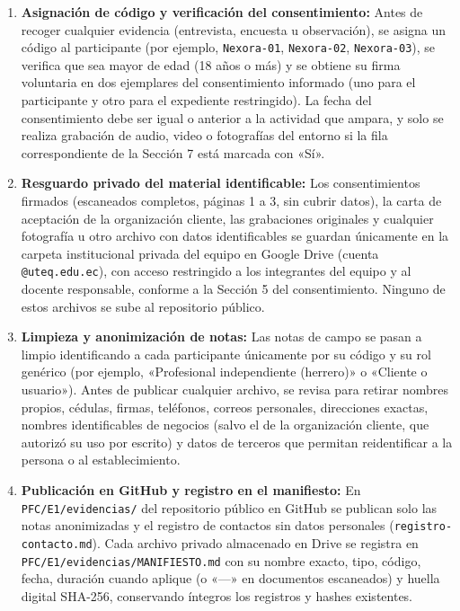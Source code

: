 \documentclass[11pt,a4paper]{article}
\begin{document}
\begin{enumerate}[label=\textbf{\arabic*.}, leftmargin=1.8em, itemsep=3pt, topsep=3pt]
    \item \textbf{Asignaci\'on de c\'odigo y verificaci\'on del consentimiento:} Antes de recoger cualquier evidencia (entrevista, encuesta u observaci\'on), se asigna un c\'odigo al participante (por ejemplo, \texttt{Nexora-01}, \texttt{Nexora-02}, \texttt{Nexora-03}), se verifica que sea mayor de edad (18 a\~nos o m\'as) y se obtiene su firma voluntaria en dos ejemplares del consentimiento informado (uno para el participante y otro para el expediente restringido). La fecha del consentimiento debe ser igual o anterior a la actividad que ampara, y solo se realiza grabaci\'on de audio, video o fotograf\'ias del entorno si la fila correspondiente de la Secci\'on 7 est\'a marcada con «S\'i».
    \item \textbf{Resguardo privado del material identificable:} Los consentimientos firmados (escaneados completos, p\'aginas 1 a 3, sin cubrir datos), la carta de aceptaci\'on de la organizaci\'on cliente, las grabaciones originales y cualquier fotograf\'ia u otro archivo con datos identificables se guardan \'unicamente en la carpeta institucional privada del equipo en Google Drive (cuenta \texttt{@uteq.edu.ec}), con acceso restringido a los integrantes del equipo y al docente responsable, conforme a la Secci\'on 5 del consentimiento. Ninguno de estos archivos se sube al repositorio p\'ublico.
    \item \textbf{Limpieza y anonimizaci\'on de notas:} Las notas de campo se pasan a limpio identificando a cada participante \'unicamente por su c\'odigo y su rol gen\'erico (por ejemplo, «Profesional independiente (herrero)» o «Cliente o usuario»). Antes de publicar cualquier archivo, se revisa para retirar nombres propios, c\'edulas, firmas, tel\'efonos, correos personales, direcciones exactas, nombres identificables de negocios (salvo el de la organizaci\'on cliente, que autoriz\'o su uso por escrito) y datos de terceros que permitan reidentificar a la persona o al establecimiento.
    \item \textbf{Publicaci\'on en GitHub y registro en el manifiesto:} En \texttt{PFC/E1/evidencias/} del repositorio p\'ublico en GitHub se publican solo las notas anonimizadas y el registro de contactos sin datos personales (\texttt{registro-contacto.md}). Cada archivo privado almacenado en Drive se registra en \texttt{PFC/E1/evidencias/MANIFIESTO.md} con su nombre exacto, tipo, c\'odigo, fecha, duraci\'on cuando aplique (o «---» en documentos escaneados) y huella digital SHA-256, conservando \'integros los registros y hashes existentes.

\end{enumerate}
\end{document}
